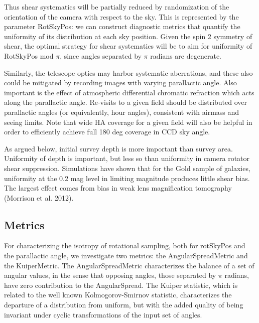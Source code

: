 Thus shear systematics will be partially reduced by randomization of the
orientation of the camera with respect to the sky.  This is represented by the
parameter RotSkyPos: we can construct diagnostic metrics that quantify the
uniformity of its distribution at each sky position.   Given the spin 2 symmetry
of shear, the optimal strategy for shear systematics will be to aim for
uniformity of RotSkyPos mod $\pi$, since angles separated by $\pi$ radians are
degenerate.

Similarly, the telescope optics may harbor systematic aberrations, and these
also could be mitigated by recording images with varying parallactic angle.
Also important is the effect of atmospheric differential chromatic refraction
which acts along the parallactic angle.  Re-visits to a given field should be
distributed over parallactic angles (or equivalently, hour angles), consistent
with airmass and seeing limits.  Note that wide HA coverage for a given field
will also  be helpful in order to efficiently achieve full 180 deg coverage in
CCD sky angle.

As argued below, initial survey depth is more important than survey area.
Uniformity of depth is important, but less so than uniformity in camera rotator
shear suppression.  Simulations have shown that for the Gold sample of galaxies,
uniformity at the 0.2 mag level in limiting magnitude produces little shear
bias. The largest effect comes from bias in weak lens magnification tomography
(Morrison et al. 2012).


\subsection{Metrics}

For characterizing the isotropy of rotational sampling, both for rotSkyPos and
the parallactic angle, we investigate two metrics: the AngularSpreadMetric and
the KuiperMetric.  The AngularSpreadMetric characterizes the balance of a set of
angular values, in the sense that opposing angles, those separated by $\pi$
radians, have zero contribution to the AngularSpread.  The Kuiper statistic,
which is related to the well known Kolmogorov-Smirnov statistic, characterizes
the departure of a distribution from uniform, but with the added quality of
being invariant under cyclic transformations of the input set of angles.

